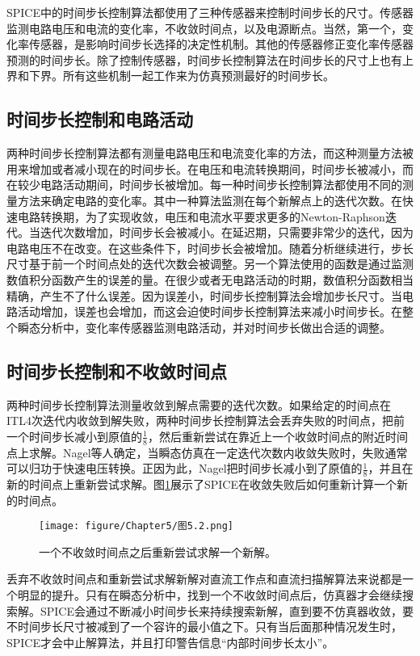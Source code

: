 SPICE中的时间步长控制算法都使用了三种传感器来控制时间步长的尺寸。传感器监测电路电压和电流的变化率，不收敛时间点，以及电源断点。当然，第一个，变化率传感器，是影响时间步长选择的决定性机制。其他的传感器修正变化率传感器预测的时间步长。除了控制传感器，时间步长控制算法在时间步长的尺寸上也有上界和下界。所有这些机制一起工作来为仿真预测最好的时间步长。

\subsection{时间步长控制和电路活动}
两种时间步长控制算法都有测量电路电压和电流变化率的方法，而这种测量方法被用来增加或者减小现在的时间步长。在电压和电流转换期间，时间步长被减小，而在较少电路活动期间，时间步长被增加。每一种时间步长控制算法都使用不同的测量方法来确定电路的变化率。其中一种算法监测在每个新解点上的迭代次数。在快速电路转换期，为了实现收敛，电压和电流水平要求更多的Newton-Raphson迭代。当迭代次数增加，时间步长会被减小。在延迟期，只需要非常少的迭代，因为电路电压不在改变。在这些条件下，时间步长会被增加。随着分析继续进行，步长尺寸基于前一个时间点处的迭代次数会被调整。另一个算法使用的函数是通过监测数值积分函数产生的误差的量。在很少或者无电路活动的时期，数值积分函数相当精确，产生不了什么误差。因为误差小，时间步长控制算法会增加步长尺寸。当电路活动增加，误差也会增加，而这会迫使时间步长控制算法来减小时间步长。在整个瞬态分析中，变化率传感器监测电路活动，并对时间步长做出合适的调整。

\subsection{时间步长控制和不收敛时间点}
两种时间步长控制算法测量收敛到解点需要的迭代次数。如果给定的时间点在ITL4次迭代内收敛到解失败，两种时间步长控制算法会丢弃失败的时间点，把前一个时间步长减小到原值的$\frac{1}{8}$，然后重新尝试在靠近上一个收敛时间点的附近时间点上求解。Nagel等人\cite{chap5-1}确定，当瞬态仿真在一定迭代次数内收敛失败时，失败通常可以归功于快速电压转换。正因为此，Nagel把时间步长减小到了原值的$\frac{1}{8}$，并且在新的时间点上重新尝试求解。图\ref{图5.2}展示了SPICE在收敛失败后如何重新计算一个新的时间点。

\begin{figure}[htbp]
\small
    \centering
    \texttt{[image: figure/Chapter5/图5.2.png]}
    \caption{一个不收敛时间点之后重新尝试求解一个新解。}
    \label{图5.2}
\end{figure}

丢弃不收敛时间点和重新尝试求解新解对直流工作点和直流扫描解算法来说都是一个明显的提升。只有在瞬态分析中，找到一个不收敛时间点后，仿真器才会继续搜索解。SPICE会通过不断减小时间步长来持续搜索新解，直到要不仿真器收敛，要不时间步长尺寸被减到了一个容许的最小值之下。只有当后面那种情况发生时，SPICE才会中止解算法，并且打印警告信息“内部时间步长太小”。

